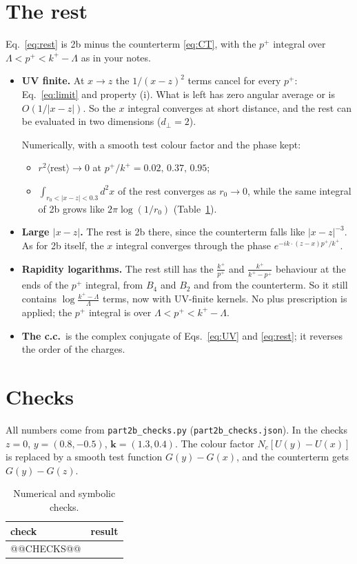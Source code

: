 \documentclass[10pt]{article}
\numberwithin{equation}{section}
\begin{document}
\section{The rest}\label{sec:rest}
Eq.~\eqref{eq:rest} is 2b minus the counterterm \eqref{eq:CT}, with the $p^+$ integral over $\Lambda<p^+<k^+-\Lambda$ as in your notes.
\begin{itemize}
\item \textbf{UV finite.} At $x\to z$ the $1/(x-z)^2$ terms cancel for every $p^+$: Eq.~\eqref{eq:limit} and property (i). What is left has zero angular average or is $O(1/|x-z|)$. So the $x$ integral converges at short distance, and the rest can be evaluated in two dimensions ($d_\perp=2$).

  Numerically, with a smooth test colour factor and the phase kept:
  \begin{itemize}
  \item $r^2\langle\text{rest}\rangle\to0$ at $p^+/k^+=0.02,\,0.37,\,0.95$;
  \item $\int_{r_0<|x-z|<0.3}d^2x$ of the rest converges as $r_0\to0$, while the same integral of 2b grows like $2\pi\log(1/r_0)$ (Table~\ref{tab:checks}).
  \end{itemize}
\item \textbf{Large $|x-z|$.} The rest is 2b there, since the counterterm falls like $|x-z|^{-3}$. As for 2b itself, the $x$ integral converges through the phase $e^{-ik\cdot(z-x)p^+/k^+}$.
\item \textbf{Rapidity logarithms.} The rest still has the $\frac{k^+}{p^+}$ and $\frac{k^+}{k^+-p^+}$ behaviour at the ends of the $p^+$ integral, from $B_4$ and $B_2$ and from the counterterm. So it still contains $\log\frac{k^+-\Lambda}{\Lambda}$ terms, now with UV-finite kernels. No plus prescription is applied; the $p^+$ integral is over $\Lambda<p^+<k^+-\Lambda$.
\item \textbf{The c.c.}\ is the complex conjugate of Eqs.~\eqref{eq:UV} and \eqref{eq:rest}; it reverses the order of the charges.
\end{itemize}

\section{Checks}\label{sec:checks}
All numbers come from \texttt{part2b\_checks.py} (\texttt{part2b\_checks.json}). In the checks $z=0$, $y=(0.8,-0.5)$, $\mathbf k=(1.3,0.4)$. The colour factor $N_c[U(y)-U(x)]$ is replaced by a smooth test function $G(y)-G(x)$, and the counterterm gets $G(y)-G(z)$.
\begin{table}[H]
\centering\small
\begin{tabular}{@{}p{} p{}@{}}
check & result\\ \hline
@@CHECKS@@
\end{tabular}
\caption{Numerical and symbolic checks.}
\label{tab:checks}
\end{table}
\end{document}
